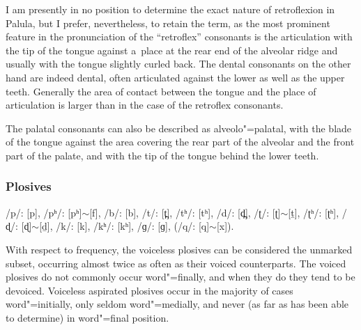 


I am presently in no position to determine the exact nature of retroflexion in Palula, but I prefer, nevertheless, to retain the term, as the most prominent feature in the pronunciation of the ``retroflex'' consonants is the articulation with the tip of the tongue against a~place at the rear end of the alveolar ridge and usually with the tongue slightly curled back. The dental consonants on the other hand are indeed dental, often articulated against the lower as well as the upper teeth. Generally the area of contact between the tongue and the place of articulation is larger than in the case of the retroflex consonants.


The palatal consonants can also be described as alveolo"=palatal, with the blade of the tongue against the area covering the rear part of the alveolar and the front part of the palate, and with the tip of the tongue behind the lower teeth. 

\subsubsection*{Plosives}
/p/: [p], /pʰ/: [pʰ]$\sim$[f], /b/: [b], /t/: [t̪], /tʰ/: [tʰ], /d/: [d̪], /ʈ/: [ʈ]$\sim$[ṯ], /ʈʰ/: [ʈʰ], /ɖ/: [ɖ]$\sim$[ḏ], /k/: [k], /kʰ/: [kʰ], /ɡ/: [ɡ], (/q/: [q]$\sim$[x]).

With respect to frequency, the voiceless plosives can be considered the unmarked subset, occurring almost twice as often as their voiced counterparts. The voiced plosives do not commonly occur word"=finally, and when they do they tend to be devoiced. Voiceless aspirated plosives occur in the majority of cases word"=initially, only seldom word"=medially, and never (as far as has been able to determine) in word"=final position. 


